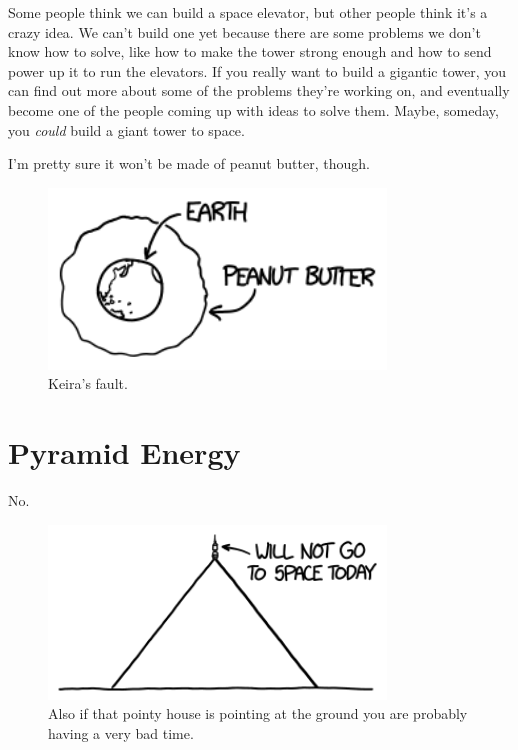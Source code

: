 {{Some people think we can build a space elevator, but other people think it's a crazy idea. We can't build one yet because there are some problems we don't know how to solve, like how to make the tower strong enough and how to send power up it to run the elevators. If you really want to build a gigantic tower, you can find out more about some of the problems they're working on, and eventually become one of the people coming up with ideas to solve them. Maybe, someday, you \emph{could} build a giant tower to space.}

{I'm pretty sure it won't be made of peanut butter, though.}

\begin{figure}[!htbp]
\centering
\includegraphics[scale=0.5, max width=0.8\textwidth]{imgs/a/94/billion_final.png}
\caption{Keira's fault.}
\end{figure}

{
\chapter{Pyramid Energy}
}

\hfill{}

{No.}

\begin{figure}[!htbp]
\centering
\includegraphics[scale=0.5, max width=0.8\textwidth]{imgs/a/95/pyramid_space.png}
\caption{Also if that pointy house is pointing at the ground you are probably having a very bad time.}
\end{figure}

}
